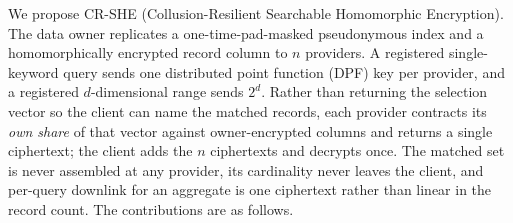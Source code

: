 \documentclass[a4paper,fleqn]{cas-sc}
\begin{document}
We propose CR-SHE (Collusion-Resilient Searchable Homomorphic Encryption). The
data owner replicates a one-time-pad-masked pseudonymous index and a
homomorphically encrypted record column to $n$ providers. A registered
single-keyword query sends one distributed point function (DPF) key per
provider, and a registered $d$-dimensional range sends $2^d$. Rather than
returning the selection vector so the client can name the matched records, each
provider contracts its \emph{own share} of that vector against owner-encrypted
columns and returns a single ciphertext; the client adds the $n$ ciphertexts
and decrypts once. The matched set is never assembled at any provider, its cardinality
never leaves the client, and per-query downlink for an aggregate is one
ciphertext rather than linear in the record count. The contributions are as
follows.
\end{document}
